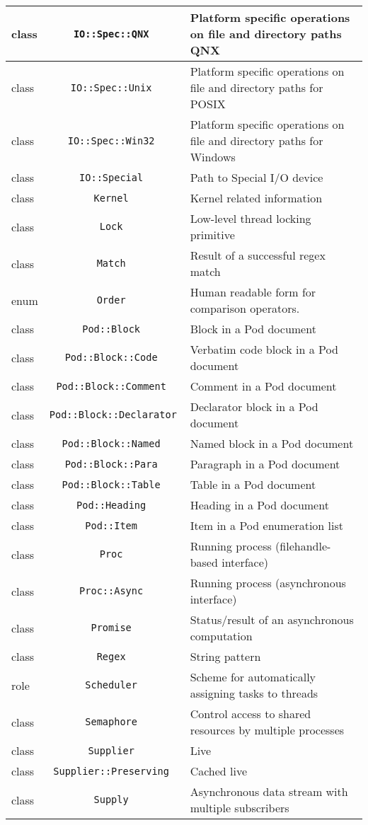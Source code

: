 \documentclass[17pt,english]{extarticle}
\providecommand{\tabularnewline}{\\}
\begin{document}
\begin{longtable}{|>{\centering}p{}|c|>{\centering}p{}}
\hline 
\hline 
class  &
\texttt{IO::Spec::QNX } &
Platform specific operations on file and directory paths QNX\tabularnewline
\hline 
\hline 
class  &
\texttt{IO::Spec::Unix } &
Platform specific operations on file and directory paths for POSIX\tabularnewline
\hline 
\hline 
class  &
\texttt{IO::Spec::Win32 } &
Platform specific operations on file and directory paths for Windows\tabularnewline
\hline 
\hline 
class  &
\texttt{IO::Special } &
Path to Special I/O device\tabularnewline
\hline 
\hline 
class  &
\texttt{Kernel } &
Kernel related information\tabularnewline
\hline 
\hline 
class  &
\texttt{Lock } &
Low-level thread locking primitive\tabularnewline
\hline 
\hline 
class  &
\texttt{Match } &
Result of a successful regex match\tabularnewline
\hline 
\hline 
enum  &
\texttt{Order } &
Human readable form for comparison operators.\tabularnewline
\hline 
\hline 
class  &
\texttt{Pod::Block } &
Block in a Pod document\tabularnewline
\hline 
\hline 
class  &
\texttt{Pod::Block::Code } &
Verbatim code block in a Pod document\tabularnewline
\hline 
\hline 
class  &
\texttt{Pod::Block::Comment } &
Comment in a Pod document\tabularnewline
\hline 
\hline 
class  &
\texttt{Pod::Block::Declarator } &
Declarator block in a Pod document\tabularnewline
\hline 
\hline 
class  &
\texttt{Pod::Block::Named } &
Named block in a Pod document\tabularnewline
\hline 
\hline 
class  &
\texttt{Pod::Block::Para } &
Paragraph in a Pod document\tabularnewline
\hline 
\hline 
class  &
\texttt{Pod::Block::Table } &
Table in a Pod document\tabularnewline
\hline 
\hline 
class  &
\texttt{Pod::Heading } &
Heading in a Pod document\tabularnewline
\hline 
\hline 
class  &
\texttt{Pod::Item } &
Item in a Pod enumeration list\tabularnewline
\hline 
\hline 
class  &
\texttt{Proc } &
Running process (filehandle-based interface)\tabularnewline
\hline 
\hline 
class  &
\texttt{Proc::Async } &
Running process (asynchronous interface)\tabularnewline
\hline 
\hline 
class  &
\texttt{Promise } &
Status/result of an asynchronous computation\tabularnewline
\hline 
\hline 
class  &
\texttt{Regex } &
String pattern\tabularnewline
\hline 
\hline 
role  &
\texttt{Scheduler } &
Scheme for automatically assigning tasks to threads\tabularnewline
\hline 
\hline 
class  &
\texttt{Semaphore } &
Control access to shared resources by multiple processes\tabularnewline
\hline 
\hline 
class  &
\texttt{Supplier } &
Live\tabularnewline
\hline 
\hline 
class  &
\texttt{Supplier::Preserving } &
Cached live\tabularnewline
\hline 
\hline 
class  &
\texttt{Supply } &
Asynchronous data stream with multiple subscribers\tabularnewline

\end{longtable}
\end{document}
